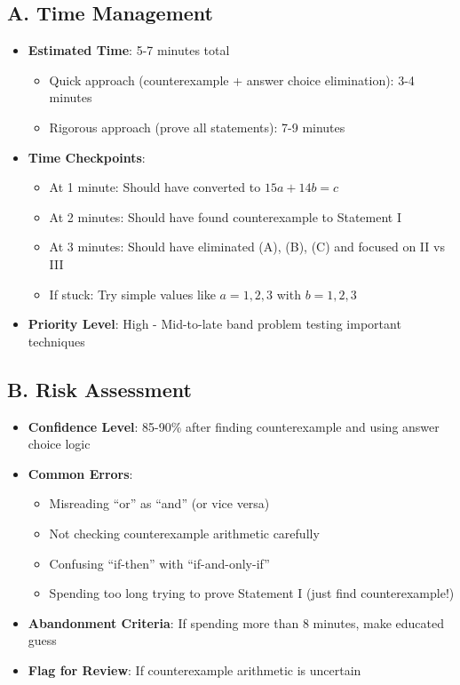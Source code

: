 \documentclass[12pt]{article}
\begin{document}
\begin{competitionbox}
\subsection*{A. Time Management}
\begin{itemize}[leftmargin=*]
    \item \textbf{Estimated Time}: 5-7 minutes total
    \begin{itemize}
        \item Quick approach (counterexample + answer choice elimination): 3-4 minutes
        \item Rigorous approach (prove all statements): 7-9 minutes
    \end{itemize}
    \item \textbf{Time Checkpoints}: 
    \begin{itemize}
        \item At 1 minute: Should have converted to $15a+14b=c$
        \item At 2 minutes: Should have found counterexample to Statement I
        \item At 3 minutes: Should have eliminated (A), (B), (C) and focused on II vs III
        \item If stuck: Try simple values like $a=1, 2, 3$ with $b=1, 2, 3$
    \end{itemize}
    \item \textbf{Priority Level}: High - Mid-to-late band problem testing important techniques
\end{itemize}

\subsection*{B. Risk Assessment}
\begin{itemize}[leftmargin=*]
    \item \textbf{Confidence Level}: 85-90\% after finding counterexample and using answer choice logic
    \item \textbf{Common Errors}:
    \begin{itemize}
        \item Misreading ``or'' as ``and'' (or vice versa)
        \item Not checking counterexample arithmetic carefully
        \item Confusing ``if-then'' with ``if-and-only-if''
        \item Spending too long trying to prove Statement I (just find counterexample!)
    \end{itemize}
    \item \textbf{Abandonment Criteria}: If spending more than 8 minutes, make educated guess
    \item \textbf{Flag for Review}: If counterexample arithmetic is uncertain
\end{itemize}


\end{competitionbox}
\end{document}
